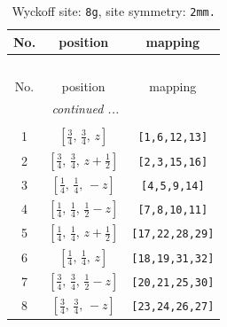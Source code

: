\documentclass[fleqn,8pt]{jsarticle}
\begin{document}
\renewcommand{\arraystretch}{1.2}
\begin{longtable}{ccc}
\caption{Wyckoff site: {\tt 8g}, site symmetry: {\tt 2mm.}}
 \\
 \hline \hline
No. & position & mapping \\ \hline \endfirsthead

\multicolumn{2}{l}{\tablename\ \thetable{}} \\
 \hline \hline
No. & position & mapping \\ \hline \endhead

 \hline \hline
\multicolumn{2}{r}{\footnotesize\it continued ...} \\ \endfoot

 \hline \hline
\multicolumn{2}{r}{} \\ \endlastfoot

1 & $\left[ \frac{3}{4},\, \frac{3}{4},\, z \right]$ & {\tt [1,6,12,13]} \\ \hline
2 & $\left[ \frac{3}{4},\, \frac{3}{4},\, z + \frac{1}{2} \right]$ & {\tt [2,3,15,16]} \\ \hline
3 & $\left[ \frac{1}{4},\, \frac{1}{4},\, - z \right]$ & {\tt [4,5,9,14]} \\ \hline
4 & $\left[ \frac{1}{4},\, \frac{1}{4},\, \frac{1}{2} - z \right]$ & {\tt [7,8,10,11]} \\ \hline
5 & $\left[ \frac{1}{4},\, \frac{1}{4},\, z + \frac{1}{2} \right]$ & {\tt [17,22,28,29]} \\ \hline
6 & $\left[ \frac{1}{4},\, \frac{1}{4},\, z \right]$ & {\tt [18,19,31,32]} \\ \hline
7 & $\left[ \frac{3}{4},\, \frac{3}{4},\, \frac{1}{2} - z \right]$ & {\tt [20,21,25,30]} \\ \hline
8 & $\left[ \frac{3}{4},\, \frac{3}{4},\, - z \right]$ & {\tt [23,24,26,27]} \\
\end{longtable}
\renewcommand{\arraystretch}{1.2}
\end{document}
